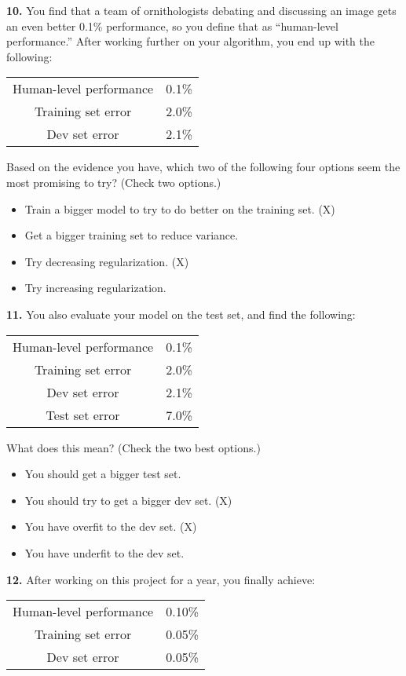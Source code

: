 \textbf{10.} You find that a team of ornithologists debating and discussing an image gets an even better 0.1\% performance, so you define that as “human-level performance.” After working further on your algorithm, you end up with the following:
\begin{center}
\begin{tabular}{ |c|c| }
 \hline
 Human-level performance & 0.1\% \\
Training set error & 2.0\% \\
Dev set error & 2.1\% \\
 \hline
\end{tabular}
\end{center}
Based on the evidence you have, which two of the following four options seem the most promising to try? (Check two options.)
\begin{itemize}
    \item Train a bigger model to try to do better on the training set. (X)
    \item Get a bigger training set to reduce variance.
    \item Try decreasing regularization. (X)
    \item Try increasing regularization.
\end{itemize}
\textbf{11.} You also evaluate your model on the test set, and find the following:
\begin{center}
\begin{tabular}{ |c|c| }
 \hline
Human-level performance & 0.1\% \\
Training set error & 2.0\% \\
Dev set error & 2.1\% \\
Test set error & 7.0\% \\
 \hline
\end{tabular}
\end{center}
What does this mean? (Check the two best options.)
\begin{itemize}
    \item You should get a bigger test set.
    \item You should try to get a bigger dev set. (X)
    \item You have overfit to the dev set. (X)
    \item You have underfit to the dev set.
\end{itemize}
\textbf{12.} After working on this project for a year, you finally achieve:
\begin{center}
\begin{tabular}{ |c|c| }
 \hline
Human-level performance & 0.10\% \\
Training set error & 0.05\% \\
Dev set error & 0.05\% \\
 \hline
\end{tabular}
\end{center}

